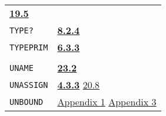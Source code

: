 \documentclass[a4paper]{scrbook}
\begin{document}
\begin{longtable}[]{@{}ll@{}}
\begin{minipage}[t]{0.70\columnwidth}
\textbf{\href{19-compiled-programs.md\#195-type-c-and-type-w}{19.5}}\strut
\end{minipage}\tabularnewline
\begin{minipage}[t]{0.24\columnwidth}\raggedright\strut
\texttt{TYPE?}\strut
\end{minipage} & \begin{minipage}[t]{0.70\columnwidth}\raggedright\strut
\textbf{\href{08-truth.md\#824-object-properties-1}{8.2.4}}\strut
\end{minipage}\tabularnewline
\begin{minipage}[t]{0.24\columnwidth}\raggedright\strut
\texttt{TYPEPRIM}\strut
\end{minipage} & \begin{minipage}[t]{0.70\columnwidth}\raggedright\strut
\textbf{\href{06-data-types.md\#633-typeprim-1}{6.3.3}}\strut
\end{minipage}\tabularnewline
\begin{minipage}[t]{0.24\columnwidth}\raggedright\strut
\strut
\end{minipage} & \begin{minipage}[t]{0.70\columnwidth}\raggedright\strut
\strut
\end{minipage}\tabularnewline
\begin{minipage}[t]{0.24\columnwidth}\raggedright\strut
\texttt{UNAME}\strut
\end{minipage} & \begin{minipage}[t]{0.70\columnwidth}\raggedright\strut
\textbf{\href{23-mdl-as-a-system-process.md\#232-names}{23.2}}\strut
\end{minipage}\tabularnewline
\begin{minipage}[t]{0.24\columnwidth}\raggedright\strut
\texttt{UNASSIGN}\strut
\end{minipage} & \begin{minipage}[t]{0.70\columnwidth}\raggedright\strut
\textbf{\href{04-values-of-atoms.md\#433-unassign}{4.3.3}}
\href{20-coroutines.md\#208-sneakiness-with-processes}{20.8}\strut
\end{minipage}\tabularnewline
\begin{minipage}[t]{0.24\columnwidth}\raggedright\strut
\texttt{UNBOUND}\strut
\end{minipage} & \begin{minipage}[t]{0.70\columnwidth}\raggedright\strut
\href{appendix-1-a-look-inside.md\#basic-data-structures}{Appendix 1}
\href{appendix-3-predefined-types.md\#appendix-3-predefined-types}{Appendix 3}\strut
\end{minipage}\tabularnewline

\end{longtable}
\end{document}
